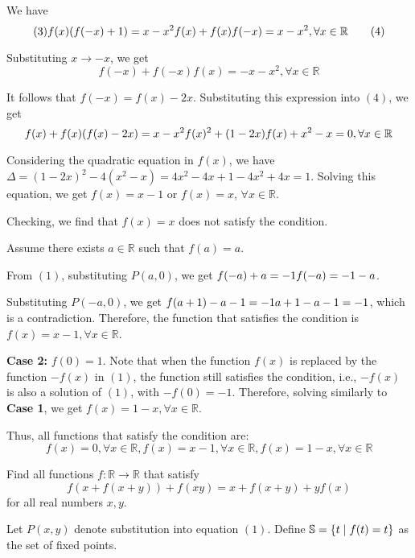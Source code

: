 \documentclass[11pt]{scrartcl}
\begin{document}
\begin{itemize}[label=, leftmargin=0em, itemsep=0.2em]
\begin{sol}
            We have 
            \[
            (3) \ra f(x)(f(-x) + 1) = x - x^2 \ra f(x) + f(x)f(-x) = x - x^2, \forall x \in \mathbb{R} \tag{4}
            \]
            
            Substituting \( x \to -x \), we get
            \[
            f(-x) + f(-x)f(x) = -x - x^2, \forall x \in \mathbb{R}
            \]
            
            It follows that \( f(-x) = f(x) - 2x \). Substituting this expression into \((4)\), we get
            \[
            f(x) + f(x)(f(x) - 2x) = x - x^2 \ra f(x)^2 + (1 - 2x)f(x) + x^2 - x = 0, \forall x \in \mathbb{R}
            \]
            
            Considering the quadratic equation in \( f(x) \), we have \( \Delta  = (1 - 2x)^2 - 4(x^2 - x) = 4x^2 - 4x + 1 - 4x^2 + 4x = 1 \). Solving this equation, we get \( f(x) = x - 1 \) or \( f(x) = x \), \( \forall x \in \mathbb{R} \). 
            
            Checking, we find that \( f(x) = x \) does not satisfy the condition.
            
            Assume there exists \( a \in \mathbb{R} \) such that \( f(a) = a \).
            
            From \((1)\), substituting \( P(a, 0) \), we get \( f(-a) + a = -1 \ra f(-a) = -1 - a \).
            
            Substituting \( P(-a, 0) \), we get \( f(a + 1) - a - 1 = -1 \ra a + 1 - a - 1 = -1 \), which is a contradiction.
            Therefore, the function that satisfies the condition is \( f(x) = x - 1, \forall x \in \mathbb{R} \).
            
            \textbf{Case 2:} \( f(0) = 1 \). Note that when the function \( f(x) \) is replaced by the function \( -f(x) \) in \((1)\), the function still satisfies the condition, i.e., \( -f(x) \) is also a solution of \((1)\), with \( -f(0) = -1 \). Therefore, solving similarly to \textbf{Case 1}, we get \( f(x) = 1 - x, \forall x \in \mathbb{R} \).
            
            Thus, all functions that satisfy the condition are:
            \[
            \boxed{f(x) = 0, \forall x \in \mathbb{R}},
            \boxed{f(x) = x - 1, \forall x \in \mathbb{R}},
            \boxed{f(x) = 1 - x, \forall x \in \mathbb{R}}
            \]
      \end{sol}



    \begin{bt}
        Find all functions $f: \mathbb{R} \to \mathbb{R}$ that satisfy
        \[
           f(x + f(x + y)) + f(xy) = x + f(x + y) + yf(x)\tag{1}
        \]
        for all real numbers $x,y$.
    \end{bt}
    \begin{sol}
       Let $P(x,y)$ denote substitution into equation $(1)$. Define $\mathbb{S} = \{t \mid f(t) = t\}$ as the set of fixed points.


\end{sol}
\end{itemize}
\end{document}
